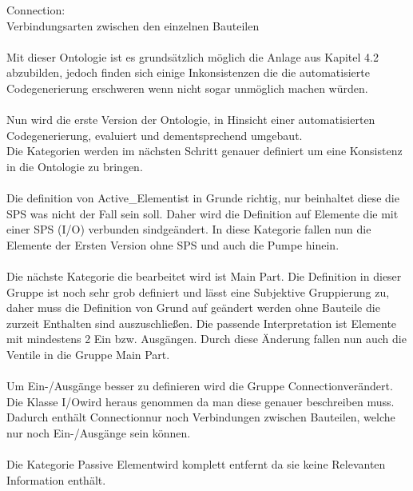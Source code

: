 Connection:\\
	Verbindungsarten zwischen den einzelnen Bauteilen\\
\\
Mit dieser Ontologie ist es grundsätzlich möglich die Anlage aus Kapitel 4.2 abzubilden, jedoch finden sich einige Inkonsistenzen die die automatisierte Codegenerierung erschweren wenn nicht sogar unmöglich machen würden.\\
\\
Nun wird die erste Version der Ontologie, in Hinsicht einer automatisierten Codegenerierung, evaluiert und dementsprechend umgebaut.\\
Die Kategorien werden im nächsten Schritt genauer definiert um eine Konsistenz in die Ontologie zu bringen.\\
\\
Die definition von \glqq Active\_Element\grqq\space ist in Grunde richtig, nur beinhaltet diese die \ac{SPS} was nicht der Fall sein soll. Daher wird die Definition auf \glqq Elemente die mit einer \ac{SPS} (I/O) verbunden sind\grqq\space geändert. In diese Kategorie fallen nun die Elemente der Ersten Version ohne \ac{SPS} und auch die Pumpe hinein.\\
\\
Die nächste Kategorie die bearbeitet wird ist \glqq Main Part\grqq\space. Die Definition in dieser Gruppe ist noch sehr grob definiert und lässt eine Subjektive Gruppierung zu, daher muss die Definition von Grund auf geändert werden ohne Bauteile die zurzeit Enthalten sind auszuschließen. Die passende Interpretation ist \glqq Elemente mit mindestens 2 Ein bzw. Ausgängen\grqq\space. Durch diese Änderung fallen nun auch die Ventile in die Gruppe \glqq Main Part\grqq\space.\\
\\
Um Ein-/Ausgänge besser zu definieren wird die Gruppe \glqq Connection\grqq\space verändert. Die Klasse \glqq I/O\grqq\space wird heraus genommen da man diese genauer beschreiben muss. Dadurch enthält \glqq Connection\grqq\space nur noch Verbindungen zwischen Bauteilen, welche nur noch Ein-/Ausgänge sein können.\\
\\
Die Kategorie \glqq Passive Element\grqq\space wird komplett entfernt da sie keine Relevanten Information enthält.

